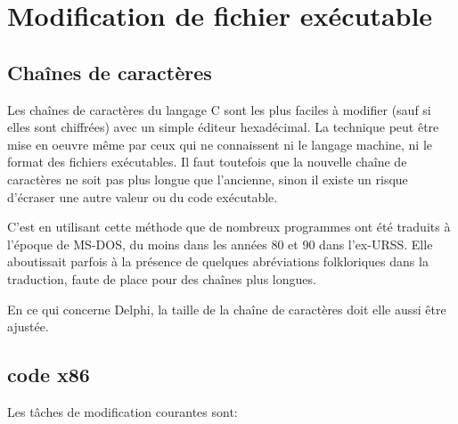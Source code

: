 ﻿\section{Modification de fichier exécutable}

\subsection{Chaînes de caractères}

Les chaînes de caractères du langage C sont les plus faciles à modifier (sauf si elles sont chiffrées)
avec un simple éditeur hexadécimal. La technique peut être mise en oeuvre même par ceux qui ne
connaissent ni le langage machine, ni le format des fichiers exécutables.
Il faut toutefois que la nouvelle chaîne de caractères ne soit pas plus longue que l'ancienne, sinon 
il existe un risque d'écraser une autre valeur ou du code exécutable.


C'est en utilisant cette méthode que de nombreux programmes ont été traduits à l'époque de MS-DOS,
du moins dans les années 80 et 90 dans l'ex-URSS. Elle aboutissait parfois à la présence de quelques abréviations folkloriques dans la traduction, faute de place pour des chaînes plus longues.


En ce qui concerne Delphi, la taille de la chaîne de caractères doit elle aussi être ajustée.

\subsection{code x86}
\label{x86_patching}

Les tâches de modification courantes sont:

